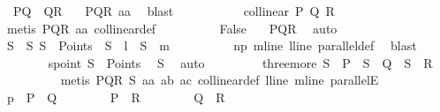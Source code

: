\begin{isabellebody}
\ {}{\isacharcolon}{\kern0pt}\ {\isachardoublequoteopen}{\isacharquery}{\kern0pt}PQ\ {\isacharequal}{\kern0pt}\ {\isacharquery}{\kern0pt}QR{\isachardoublequoteclose}\ \isamarkupfalse%
\ {\isachardoublequoteopen}{}{\isachardoublequoteclose}\ PQR\ a{}a\ \isamarkupfalse%
\ blast\isanewline
\ \ \ \ \ \ \ \ \isamarkupfalse%
\ {}{\isacharcolon}{\kern0pt}\ {\isachardoublequoteopen}collinear\ P\ Q\ R{\isachardoublequoteclose}\ \isamarkupfalse%
\ {}\ \isamarkupfalse%
\ {\isacharparenleft}{\kern0pt}metis\ PQR\ a{}a\ collinear{\isacharunderscore}{\kern0pt}def{\isacharparenright}{\kern0pt}\isanewline
\ \ \ \ \ \ \ \ \isamarkupfalse%
\ False\ \isamarkupfalse%
\ {}\ PQR\ \isamarkupfalse%
\ auto\isanewline
\ \ \ \ \ \ \isamarkupfalse%
\isanewline
\ \ \ \ \ \ \isamarkupfalse%
\ S\ \ S{\isacharcolon}{\kern0pt}\ {\isachardoublequoteopen}S\ {\isasymin}\ Points\ {\isasymand}\ S\ {\isasymlhd}\ {\isacharquery}{\kern0pt}l\ {\isasymand}\ S\ {\isasymlhd}\ {\isacharquery}{\kern0pt}m{\isachardoublequoteclose}\isanewline
\ \ \ \ \ \ \ \ \isamarkupfalse%
\ np\ mline\ lline\ parallel{\isacharunderscore}{\kern0pt}def\ \isamarkupfalse%
\ blast\isanewline
\ \ \ \ \ \ \isamarkupfalse%
\ spoint{\isacharcolon}{\kern0pt}\ {\isachardoublequoteopen}S\ {\isasymin}\ Points{\isachardoublequoteclose}\ \isamarkupfalse%
\ S\ \isamarkupfalse%
\ auto\ \isanewline
\ \ \ \ \ \ \isamarkupfalse%
\ three{\isacharunderscore}{\kern0pt}more{\isacharcolon}{\kern0pt}\ {\isachardoublequoteopen}S\ {\isasymnoteq}\ P\ {\isasymand}\ S\ {\isasymnoteq}\ Q\ {\isasymand}\ S\ {\isasymnoteq}\ R{\isachardoublequoteclose}\isanewline
\ \ \ \ \ \ \ \ \isamarkupfalse%
\ {\isacharparenleft}{\kern0pt}metis\ PQR\ S\ a{}a\ a{}b\ a{}c\ collinear{\isacharunderscore}{\kern0pt}def\ lline\ mline\ parallelE{\isacharparenright}{\kern0pt}\isanewline
\ \ \ \ \ \ \isamarkupfalse%
\ p{}{\isacharcolon}{\kern0pt}\ {\isachardoublequoteopen}\ P\ {\isasymnoteq}\ Q\ {\isasymand}\isanewline
\ \ \ \ \ \ \ P\ {\isasymnoteq}\ R\ {\isasymand}\isanewline
\ \ \ \ \ \ \ Q\ {\isasymnoteq}\ R{\isachardoublequoteclose}\ \isamarkupfalse%

\end{isabellebody}

